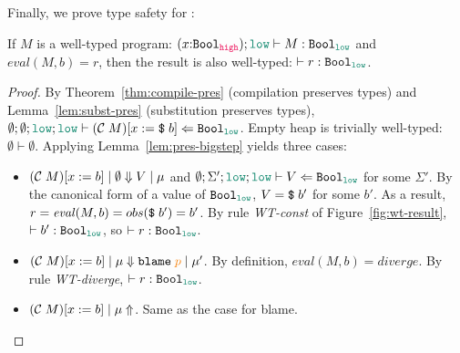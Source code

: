 Finally, we prove type safety for \Surface:

\begin{theorem}
  \label{thm:type-safety}
  If $M$ is a well-typed \Surface program: $(x{:}\Bool_{\high});\low \vdash M : \Bool_{\low}$
  and $\mathit{eval}(M,b)=r$,
  then the result is also well-typed: $\vdash r : \Bool_{\low}$.
\end{theorem}
\begin{proof}
  By Theorem~\ref{thm:compile-pres} (compilation preserves types) and
  Lemma~\ref{lem:subst-pres} (substitution preserves types), $\emptyset ;
  \emptyset ; \low ; \low \vdash (\compile{M})[x:=\ccconst{b}] \Leftarrow
  \Bool_{\low}$. Empty heap is trivially well-typed: $\emptyset \vdash
  \emptyset$. Applying Lemma~\ref{lem:pres-bigstep} yields three cases:
  \begin{itemize}
  \item $(\mathcal{C}\;{M})[x:=b] \mid \emptyset \Downarrow V \mid \mu$ and $\emptyset ; \Sigma' ; \low
    ; \low \vdash V \Leftarrow \Bool_{\low}$ for some $\Sigma'$. By the
    canonical form of a value of $\Bool_{\low}$, $V = \text{\texttt{{\$}}}\;{b'}$ for some
    $b'$. As a result, $r=\mathit{eval}(M,b)=obs(\text{\texttt{{\$}}}\;{b'})=b'$. By rule
    \textit{WT-const} of Figure~\ref{fig:wt-result}, $\vdash b' : \Bool_{\low}$,
    so $\vdash r : \Bool_{\low}$.
  \item $(\compile{M})[x:=b] \mid \mu \Downarrow \blame{p} \mid \mu'$. By
    definition, $\mathit{eval}(M,b)=\mathit{diverge}$. By rule
    \textit{WT-diverge}, $\vdash r : \Bool_{\low}$.
  \item $(\mathcal{C}\;{M})[x:=b] \mid \mu \Uparrow$. Same as the case for blame.
  \end{itemize}
\end{proof}
